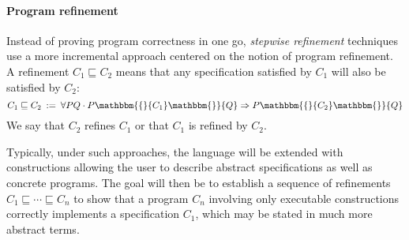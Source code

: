\documentclass[sigplan,screen]{acmart}
\newcommand{\htr}[3]{{ {#1} \mathbbm{\{} {#2} \mathbbm{\}} {#3} }}
\begin{document}

%
%

\paragraph{Program refinement} %

Instead of proving program correctness in one go,
\emph{stepwise refinement} techniques use a more incremental approach
centered on the notion of program refinement.
A refinement $C_1 \sqsubseteq C_2$
means that any specification satisfied by $C_1$
will also be satisfied by $C_2$:
\[
    C_1 \sqsubseteq C_2 \: := \:
    \forall P Q \cdot
      \htr{P}{C_1}{Q} \Rightarrow
      \htr{P}{C_2}{Q}
\]
We say that $C_2$ refines $C_1$
or that $C_1$ is refined by $C_2$.

Typically,
under such approaches,
the language will be extended with constructions
allowing the user to describe
abstract specifications as well as
concrete programs.
The goal will then be to establish
a sequence of refinements
$C_1 \sqsubseteq \cdots \sqsubseteq C_n$
to show that a program $C_n$ involving
only executable constructions
correctly implements a specification $C_1$,
which may be stated in much more abstract terms.
\end{document}
